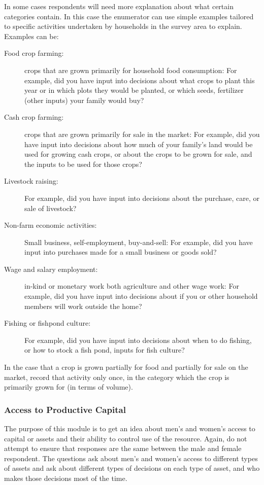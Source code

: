 \documentclass[a4paper]{refart}
\begin{document}
In some cases respondents will need more explanation about what certain categories contain. In this case the enumerator can use simple examples tailored to specific activities undertaken by households in the survey area to explain.
Examples can be:
\begin{description}
\item[Food crop farming:] crops that are grown primarily for household food consumption: For example, did you have input into decisions about what crops to plant this year or in which plots they would be planted, or which seeds, fertilizer (other inputs) your family would buy?
\item[Cash crop farming:] crops that are grown primarily for sale in the market: For example, did you have input into decisions about how much of your family's land would be used for growing cash crops, or about the crops to be grown for sale, and the inputs to be used for those crops?
\item[Livestock raising:] For example, did you have input into decisions about the purchase, care, or sale of livestock?
\item[Non-farm economic activities:] Small business, self-employment, buy-and-sell: For example, did you have input into purchases made for a small business or goods sold?
\item[Wage and salary employment:] in-kind or monetary work both agriculture and other wage work: For example, did you have input into decisions about if you or other household members will work outside the home?
\item[Fishing or fishpond culture:] For example, did you have input into decisions about when to do fishing, or how to stock a fish pond, inputs for fish culture?
\end{description}
In the case that a crop is grown partially for food and partially for sale on the market, record that activity only once, in the category which the crop is primarily grown for (in terms of volume).

\subsubsection{Access to Productive Capital}
The purpose of this module is to get an idea about men's and women's access to capital or assets and their ability to control use of the resource. Again, do not attempt to ensure that responses are the same between the male and female respondent.
The questions ask about men's and women's access to different types of assets and ask about different types of decisions on each type of asset, and who makes those decisions most of the time.
\end{document}
